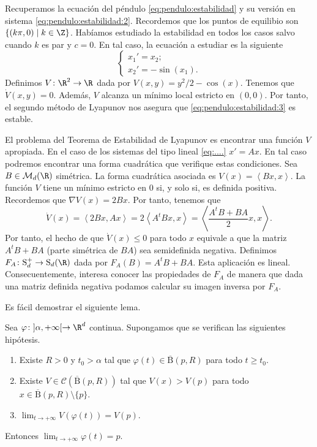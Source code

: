 \begin{ex}
  Recuperamos la ecuación del péndulo \eqref{eq:pendulo:estabilidad} y su versión en sistema
  \eqref{eq:pendulo:estabilidad:2}. Recordemos que los puntos de equilibio son
  $\{(k \pi, 0) \mid k \in \Z\}$. Habíamos estudiado la estabilidad en todos los casos salvo cuando
  $k$ es par y $c = 0$. En tal caso, la ecuación a estudiar es la siguiente
  \begin{equation}
    \label{eq:pendulo:estabilidad:3}
    \begin{cases}
      x_1' = x_2; \\
      x_2' = - \sin(x_1).
    \end{cases}
  \end{equation}
  Definimos $V \colon \R^2 \to \R$ dada por $V(x,y) = y^2 /2 - \cos(x)$. Tenemos que
  $\dot{V}(x,y) = 0$. Además, $V$ alcanza un mínimo local estricto en $(0,0)$. Por tanto, el segundo
  método de Lyapunov nos asegura que \eqref{eq:pendulo:estabilidad:3} es estable.
\end{ex}

El problema del Teorema de Estabilidad de Lyapunov es encontrar una función $V$ apropiada. En el
caso de los sistemas del tipo lineal \eqref{eq:....} $x' = A x$. En tal caso podremos encontrar una
forma cuadrática que verifique estas condiciones. Sea $B \in \mathcal{M}_d(\R)$ simétrica. La forma
cuadrática asociada es $V(x) = \left\langle Bx, x \right\rangle$. La función $V$ tiene un mínimo
estricto en $0$ si, y solo si, es definida positiva. Recordemos que $\nabla V(x) = 2 Bx$. Por tanto,
tenemos que
\[\dot{V}(x) = \left\langle 2 B x, Ax \right\rangle = 2 \left\langle A^{t} Bx, x \right\rangle =
  \left\langle \frac{A^{t}B + B A}{2} x, x\right\rangle.\] Por tanto, el hecho de que
$\dot{V}(x) \le 0$ para todo $x$ equivale a que la matriz $A^{t}B + B A$ (parte simétrica de $BA$)
sea semidefinida negativa. Definimos $F_A \colon \mathrm{S}^+_d \to \mathrm{S}_d(\R)$ dada por
$F_A(B) = A^{t}B+BA$. Esta aplicación es lineal. Consecuentemente, interesa conocer las propiedades
de $F_A$ de manera que dada una matriz definida negativa podamos calcular su imagen inversa por
$F_A$.

Es fácil demostrar el siguiente lema.
\begin{lemma}
  Sea $\varphi \colon ]\alpha, +\infty[ \to \R^d$ continua. Supongamos que se verifican las
  siguientes hipótesis.
  \begin{enumerate}
  \item Existe $R > 0$ y $t_0 > \alpha$ tal que $\varphi(t) \in \overline{\mathrm{B}}(p,R)$ para
    todo $t \ge t_0$.
  \item Existe $V \in \mathcal{C}(\overline{\mathrm{B}}(p,R))$ tal que $V(x) > V(p)$ para todo
    $x \in \overline{\mathrm{B}}(p,R)\setminus \{p\}$.
  \item $\lim_{t \to +\infty} V(\varphi(t)) = V(p)$.
  \end{enumerate}
  Entonces $\lim_{t \to +\infty} \varphi(t) = p$.
\end{lemma}

